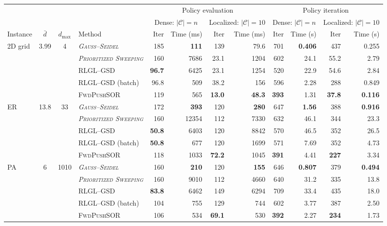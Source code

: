 \documentclass[letterpaper, 10 pt, conference]{ieeeconf}
\begin{document}
\begin{table}[t]
\centering
\scriptsize
\setlength{\tabcolsep}{3pt}
\begin{tabular}{@{}lcclrrrrrrrr@{}}
\toprule
&&&& \multicolumn{4}{c}{Policy evaluation}
& \multicolumn{4}{c}{Policy iteration} \\
\cmidrule(lr){5-8}\cmidrule(l){9-12}
&&&& \multicolumn{2}{c}{Dense: $|\mathcal C|=n$}
& \multicolumn{2}{c}{Localized: $|\mathcal C|=10$}
& \multicolumn{2}{c}{Dense: $|\mathcal C|=n$}
& \multicolumn{2}{c}{Localized: $|\mathcal C|=10$} \\
\cmidrule(lr){5-6}\cmidrule(lr){7-8}
\cmidrule(lr){9-10}\cmidrule(l){11-12}
Instance & $\bar d$ & $d_{\max}$ & Method
& Iter& Time (ms) & Iter & Time (ms)
& Iter & Time (s)  & Iter & Time (s) \\
\midrule

2D grid & 3.99 & 4
& \textit{\textsc{Gauss--Seidel}}
& 185 & \textbf{111} & 139 & 79.6
& 701 & \textbf{0.406} & 437 & 0.255 \\
& &
& \textit{\textsc{Prioritized Sweeping}}
& 160 & 7686 & 23.1 & 1204
& 602 & 24.1 & 55.2 & 2.79 \\
& &
& \textsc{RLGL--GSD}
& \textbf{96.7} & 6425 & 23.1 & 1254
& 520 & 22.9 & 54.6 & 2.84 \\
& &
& \textsc{RLGL--GSD} (batch)
& 96.8 & 509 & 38.2 & 156
& 596 & 2.28 & 288 & 0.849 \\
& &
& \textsc{FwdPushSOR}
& 119 & 565 & \textbf{13.0} & \textbf{48.3}
& \textbf{393} & 1.31 & \textbf{37.8} & \textbf{0.116} \\
\midrule

ER & 13.8 & 33
& \textit{\textsc{Gauss--Seidel}}
& 172 & \textbf{393} & 120 & \textbf{280}
& 647 & \textbf{1.56} & 388 & \textbf{0.916} \\
& &
& \textit{\textsc{Prioritized Sweeping}}
& 160 & 12354 & 112 & 7330
& 632 & 46.1 & 344 & 23.3 \\
& &
& \textsc{RLGL--GSD}
& \textbf{50.8} & 6403 & 120 & 8842
& 570 & 46.5 & 352 & 26.5 \\
& &
& \textsc{RLGL--GSD} (batch)
& \textbf{50.8} & 677 & 120 & 1699
& 571 & 7.69 & 352 & 4.73 \\
& &
& \textsc{FwdPushSOR}
& 118 & 1033 & \textbf{72.2} & 1045
& \textbf{391} & 4.41 & \textbf{227} & 3.34 \\
\midrule

PA & 6 & 1010
& \textit{\textsc{Gauss--Seidel}}
& 160 & \textbf{210} & 120 & \textbf{155}
& 646 & \textbf{0.807} & 379 & \textbf{0.494} \\
& &
& \textit{\textsc{Prioritized Sweeping}}
& 160 & 9010 & 112 & 4660
& 640 & 31.2 & 335 & 13.8 \\
& &
& \textsc{RLGL--GSD}
& \textbf{83.8} & 6462 & 149 & 6294
& 709 & 33.4 & 435 & 18.0 \\
& &
& \textsc{RLGL--GSD} (batch)
& 104 & 755 & 129 & 744
& 602 & 3.77 & 387 & 2.50 \\
& &
& \textsc{FwdPushSOR}
& 106 & 534 & \textbf{69.1} & 530
& \textbf{392} & 2.27 & \textbf{234} & 1.73 \\
\midrule


\end{tabular}
\end{table}
\end{document}
